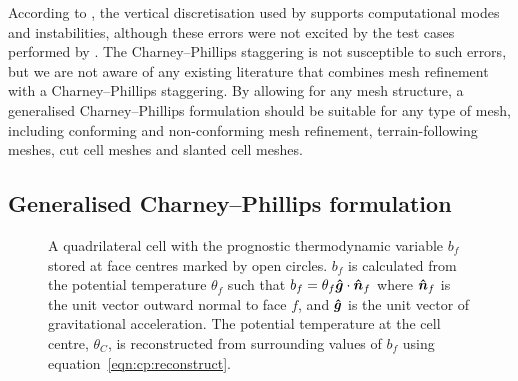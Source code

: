 According to \citet{thuburn-woolings2005}, the vertical discretisation used by \citet{yamazaki-satomura2012} supports computational modes and instabilities, although these errors were not excited by the test cases performed by \citet{yamazaki-satomura2012}.
The Charney--Phillips staggering is not susceptible to such errors, but we are not aware of any existing literature that combines mesh refinement with a Charney--Phillips staggering.
By allowing for any mesh structure, a generalised Charney--Phillips formulation should be suitable for any type of mesh, including conforming and non-conforming mesh refinement, terrain-following meshes, cut cell meshes and slanted cell meshes.

\subsection{Generalised Charney--Phillips formulation}

\begin{figure}
	\centering
	
	\caption{A quadrilateral cell with the prognostic thermodynamic variable $b_f$ stored at face centres marked by open circles.
	$b_f$ is calculated from the potential temperature $\theta_f$ such that $b_f = \theta_f \bm{\hat{g}} \cdot \bm{\hat{n}}_f$ where $\bm{\hat{n}}_f$ is the unit vector outward normal to face $f$, and $\bm{\hat{g}}$ is the unit vector of gravitational acceleration.
	The potential temperature at the cell centre, $\theta_C$, is reconstructed from surrounding values of $b_f$ using equation~\eqref{eqn:cp:reconstruct}.}
	\label{fig:cp:staggering}
\end{figure}

